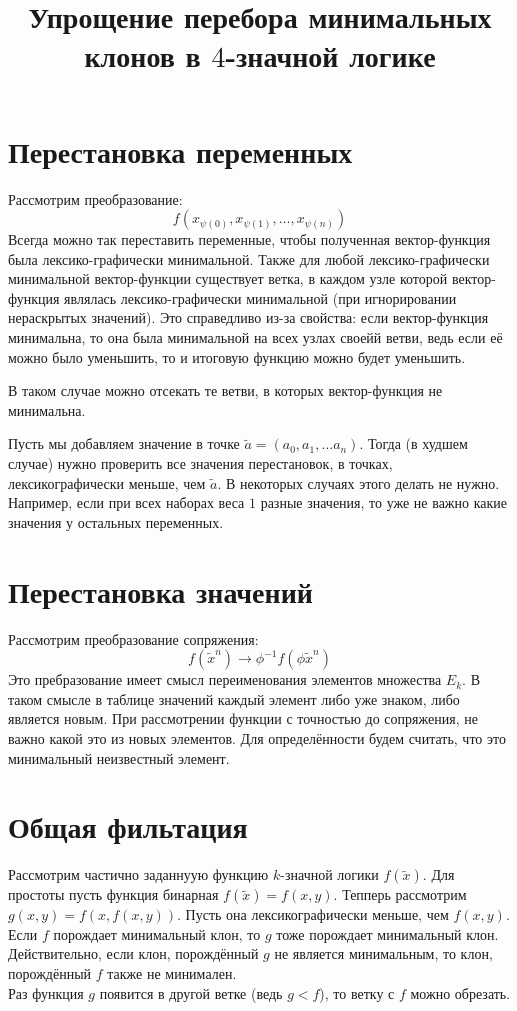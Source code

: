 \documentclass{article}
\title{Упрощение перебора минимальных клонов в $4$-значной логике}
\begin{document}
\maketitle
\tableofcontents
\newpage
\section{Перестановка переменных}
	Рассмотрим преобразование:
	\[f(x_{\psi(0)},x_{\psi(1)},\dots,x_{\psi(n)})\]
	Всегда можно так переставить переменные, чтобы полученная вектор-функция была лексико-графически минимальной.
	Также для любой лексико-графически минимальной вектор-функции существует ветка,
		в каждом узле которой вектор-функция являлась лексико-графически минимальной (при игнорировании нераскрытых значений).
	Это справедливо из-за свойства: если вектор-функция минимальна, то она была минимальной на всех узлах своейй ветви,
		ведь если её можно было уменьшить, то и итоговую функцию можно будет уменьшить.

	В таком случае можно отсекать те ветви, в которых вектор-функция не минимальна.

	Пусть мы добавляем значение в точке $\tilde a=(a_0,a_1,\dots a_n)$.
	Тогда (в худшем случае) нужно проверить все значения перестановок, в точках, лексикографически меньше, чем $\tilde a$.
	В некоторых случаях этого делать не нужно.
	Например, если при всех наборах веса $1$ разные значения, то уже не важно какие значения у остальных переменных.
\section{Перестановка значений}
	Рассмотрим преобразование сопряжения:
	\[f(\tilde x^n)\rightarrow\phi^{-1}f(\phi \tilde x^n)\]
	Это пребразование имеет смысл переименования элементов множества $E_k$.
	В таком смысле в таблице значений каждый элемент либо уже знаком, либо является новым.
	При рассмотрении функции с точностью до сопряжения, не важно какой это из новых элементов.
	Для определённости будем считать, что это минимальный неизвестный элемент.
\section{Общая фильтация}
	Рассмотрим частично заданнуую функцию $k$-значной логики $f(\tilde x)$.
	Для простоты пусть функция бинарная $f(\tilde x)=f(x,y)$.
	Тепперь рассмотрим $g(x,y) = f(x,f(x,y))$.
	Пусть она лексикографически меньше, чем $f(x,y)$.\\
	Если $f$ порождает минимальный клон,
		то $g$ тоже порождает минимальный клон.\\
	Действительно, если клон, порождённый $g$ не является минимальным,
		то клон, порождённый $f$ также не минимален.\\
	Раз функция $g$ появится в другой ветке (ведь $g<f$),
		то ветку с $f$ можно обрезать.
\end{document}
